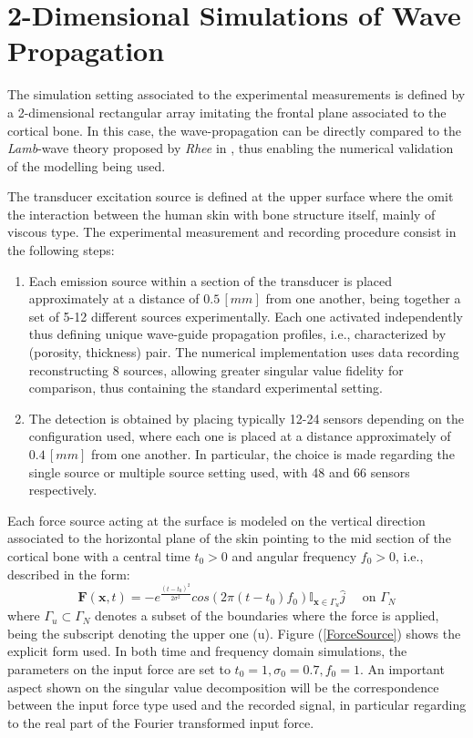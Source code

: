 \section{2-Dimensional Simulations of Wave Propagation}
The simulation setting associated to the experimental measurements is defined by a 2-dimensional rectangular array imitating the frontal plane associated to the cortical bone. In this case, the wave-propagation can be directly compared to the \textit{Lamb}-wave  theory proposed by \textit{Rhee} in \cite{Rhee2007}, thus enabling the numerical validation of the modelling being used. 

The transducer excitation source is defined at the upper surface where the omit the interaction between the human skin with bone structure itself, mainly of viscous type.
The experimental measurement and recording procedure consist in the following steps:
\begin{enumerate}
    \item Each emission source within a section of the transducer is placed approximately at a distance of $0.5 \, [mm]$ from one another, being together a set of 5-12 different sources experimentally. Each one activated independently thus defining unique wave-guide propagation profiles, i.e., characterized by (porosity, thickness) pair. The numerical implementation uses data recording reconstructing 8 sources, allowing greater singular value fidelity for comparison, thus containing the standard experimental setting.
    
    \item The detection is obtained by placing typically 12-24 sensors depending on the configuration used, where each one is placed at a distance approximately of $0.4 \, [mm]$ from one another. In particular, the choice is made regarding the single source or multiple source setting used, with 48 and 66 sensors respectively.
\end{enumerate}
Each force source acting at the surface is modeled on the vertical direction associated to the horizontal plane of the skin pointing to the mid section of the cortical bone with a central time $t_0 > 0$ and angular frequency $f_0 > 0$, i.e., described in the form:
\begin{equation}
    \label{Force-eq}
    \mathbf{F}(\mathbf{x},t) = - e^{\frac{(t-t_0)^2}{2\sigma^2}} cos( 2 \pi (t-t_0) f_0 ) \mathbb{I}_{\mathbf{x} \in \Gamma_u} \hat{j} \quad \text{ on } \Gamma_N
\end{equation}
where $\Gamma_u \subset \Gamma_N$ denotes a subset of the boundaries where the force is applied, being the subscript denoting the upper one (u). Figure (\ref{ForceSource}) shows the explicit form used. In both time and frequency domain simulations, the parameters on the input force are set to $t_0 = 1, \sigma_0 = 0.7, f_0 = 1$. An important aspect shown on the singular value decomposition will be the correspondence between the input force type used and the recorded signal, in particular regarding to the real part of the Fourier transformed input force.

